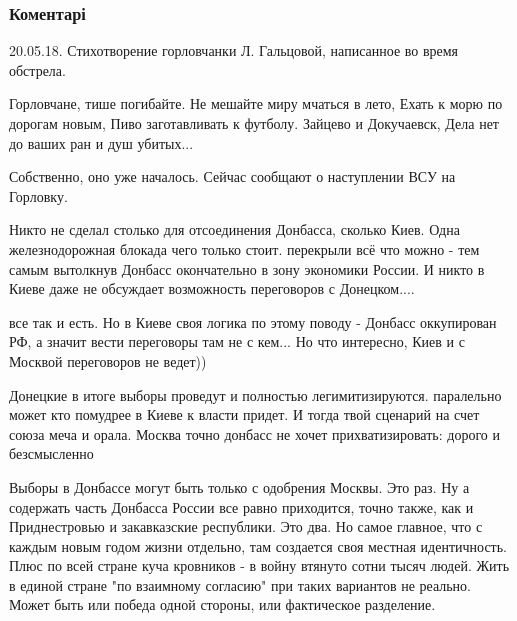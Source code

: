  
 
 
 
 
\subsubsection{Коментарі}
\label{sec:21_05_2018.fb.lesev_igor.1.obostrenie_na_donbasse.cmt}

\begin{itemize} %

20.05.18. Стихотворение горловчанки Л. Гальцовой, написанное во время обстрела.

\obeycr
Горловчане, тише погибайте.
Не мешайте миру мчаться в лето,
Ехать к морю по дорогам новым,
Пиво заготавливать к футболу.
Зайцево и Докучаевск,
Дела нет до ваших ран и душ убитых...
\restorecr


Собственно, оно уже началось. Сейчас сообщают о наступлении ВСУ на Горловку.


Никто не сделал столько для отсоединения Донбасса, сколько Киев. Одна
железнодорожная блокада чего только стоит. перекрыли всё что можно - тем самым
вытолкнув Донбасс окончательно в зону экономики России. И никто в Киеве даже не
обсуждает возможность переговоров с Донецком....

\begin{itemize} %

все так и есть. Но в Киеве своя логика по этому поводу - Донбасс оккупирован
РФ, а значит вести переговоры там не с кем... Но что интересно, Киев и с
Москвой переговоров не ведет))


Донецкие в итоге выборы проведут и полностью легимитизируются. паралельно может
кто помудрее в Киеве к власти придет. И тогда твой сценарий на счет союза меча
и орала. Москва точно донбасс не хочет прихватизировать: дорого и безсмысленно


Выборы в Донбассе могут быть только с одобрения Москвы. Это раз. Ну а содержать
часть Донбасса России все равно приходится, точно также, как и Приднестровью и
закавказские республики. Это два. Но самое главное, что с каждым новым годом
жизни отдельно, там создается своя местная идентичность. Плюс по всей стране
куча кровников - в войну втянуто сотни тысяч людей. Жить в единой стране "по
взаимному согласию" при таких вариантов не реально. Может быть или победа одной
стороны, или фактическое разделение.


\end{itemize}
\end{itemize}

